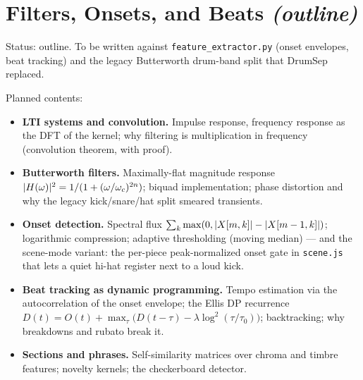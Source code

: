 \chapter{Filters, Onsets, and Beats \emph{(outline)}}\label{ch:filters}

\begin{incode}
Status: outline. To be written against \texttt{feature\_extractor.py} (onset
envelopes, beat tracking) and the legacy Butterworth drum-band split that
DrumSep replaced.
\end{incode}

Planned contents:
\begin{itemize}
  \item \textbf{LTI systems and convolution.} Impulse response, frequency
  response as the DFT of the kernel; why filtering is multiplication in
  frequency (convolution theorem, with proof).
  \item \textbf{Butterworth filters.} Maximally-flat magnitude response
  $\lvert H(\omega)\rvert^2 = 1/(1 + (\omega/\omega_c)^{2n})$; biquad
  implementation; phase distortion and why the legacy kick/snare/hat split
  smeared transients.
  \item \textbf{Onset detection.} Spectral flux
  $\sum_k \max(0, \lvert X[m,k]\rvert - \lvert X[m-1,k]\rvert)$; logarithmic compression;
  adaptive thresholding (moving median) --- and the scene-mode variant: the
  per-piece peak-normalized onset gate in \texttt{scene.js} that lets a quiet
  hi-hat register next to a loud kick.
  \item \textbf{Beat tracking as dynamic programming.} Tempo estimation via
  the autocorrelation of the onset envelope; the Ellis DP recurrence
  $D(t) = O(t) + \max_\tau \big(D(t - \tau) - \lambda
  \log^2(\tau/\tau_0)\big)$; backtracking; why breakdowns and rubato break
  it.
  \item \textbf{Sections and phrases.} Self-similarity matrices over chroma
  and timbre features; novelty kernels; the checkerboard detector.
\end{itemize}
